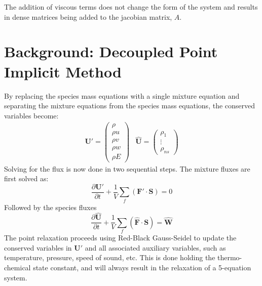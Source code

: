 \documentclass[]{aiaa-tc}%
\begin{document}
The addition of viscous terms does not change the form of the system and results in dense matrices being added to the jacobian matrix, $A$.

\section{Background: Decoupled Point Implicit Method}

By replacing the species mass equations with a single mixture equation and separating the mixture equations from the species mass equations, the conserved variables become:
%
\begin{equation}
	\begin{matrix}
		\mathbf{U}'=\begin{pmatrix}
			\rho \\
			\rho u \\
			\rho v \\
			\rho w \\
			\rho E
		\end{pmatrix} &
		\mathbf{\hat{U}}=\begin{pmatrix}
			\rho_1 \\
			\vdots \\
			\rho_{ns}
		\end{pmatrix}
	\end{matrix}
\end{equation}
%
Solving for the flux is now done in two sequential steps.  The mixture fluxes are first solved as:
%
\begin{equation}
	\frac{\partial \mathbf{{U}'}}{\partial t}
	 + \frac{1}{V}\sum\limits_{f}(\mathbf{F}'\cdot\mathbf{S}) = 0
 \end{equation}
 Followed by the species fluxes
%
\begin{equation}
	\frac{\partial \mathbf{\hat{U}}}{\partial t}
	 + \frac{1}{V}\sum\limits_{f}(\mathbf{\hat{F}}\cdot\mathbf{S}) = \mathbf{\hat{W}}
 \end{equation}
The point relaxation proceeds using Red-Black Gauss-Seidel to update the conserved variables in $\mathbf{U}'$ and all associated auxiliary variables, such as temperature, pressure, speed of sound, etc.  This is done holding the thermo-chemical state constant, and will always result in the relaxation of a 5-equation system.
 
\end{document}
